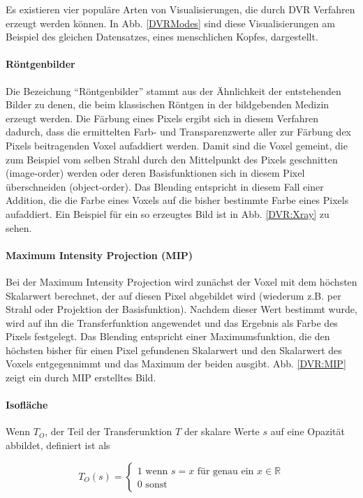 \documentclass[a4paper,fontsize=12pt,toc=bib,halfparskip]{scrartcl}
\begin{document}
Es existieren vier popul\"are Arten von Visualisierungen, die durch DVR Verfahren erzeugt werden k\"onnen. In Abb. \ref{DVRModes} sind diese Visualisierungen am Beispiel des gleichen Datensatzes, eines menschlichen Kopfes, dargestellt.

\paragraph{R\"ontgenbilder}
Die Bezeichung ``R\"ontgenbilder'' stammt aus der \"Ahnlichkeit der entstehenden Bilder zu denen, die beim klassischen R\"ontgen in der bildgebenden Medizin erzeugt werden. Die F\"arbung eines Pixels ergibt sich in diesem Verfahren dadurch, dass die ermittelten Farb- und Transparenzwerte aller zur F\"arbung dex Pixels beitragenden Voxel aufaddiert werden. Damit sind die Voxel gemeint, die zum Beispiel vom selben Strahl durch den Mittelpunkt des Pixels geschnitten (image-order) werden oder deren Basisfunktionen sich in diesem Pixel \"uberschneiden (object-order). Das Blending entspricht in diesem Fall einer Addition, die die Farbe eines Voxels auf die bisher bestimmte Farbe eines Pixels aufaddiert. Ein Beispiel f\"ur ein so erzeugtes Bild ist in Abb. \ref{DVR:Xray} zu sehen. 

\paragraph{Maximum Intensity Projection (MIP)}
Bei der Maximum Intensity Projection wird zun\"achst der Voxel mit dem h\"ochsten Skalarwert berechnet, der auf diesen Pixel abgebildet wird (wiederum z.B. per Strahl oder Projektion der Basisfunktion). Nachdem dieser Wert bestimmt wurde, wird auf ihn die Transferfunktion angewendet und das Ergebnis als Farbe des Pixels festgelegt. Das Blending entspricht einer Maximumsfunktion, die den h\"ochsten bisher f\"ur einen Pixel gefundenen Skalarwert und den Skalarwert des Voxels entgegennimmt und das Maximum der beiden ausgibt. Abb. \ref{DVR:MIP} zeigt ein durch MIP erstelltes Bild. 


\paragraph{Isofl\"ache}
Wenn $T_O$, der Teil der Transferunktion $T$ der skalare Werte $s$ auf eine Opazit\"at abbildet, definiert ist als

\begin{equation}
T_O(s) = 
\begin{cases}
1\text{ wenn $s=x$ f\"ur genau ein $x \in \mathbb{R}$}\\
0\text{ sonst}
\end{cases}
\end{equation}
\end{document}
